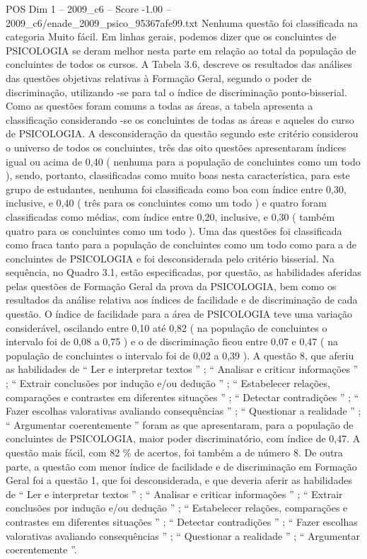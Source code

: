 \begin{textsample}{POS Dim 1 – 2009\_c6 – Score -1.00 – 2009\_c6/enade\_2009\_psico\_95367afe99.txt}
Nenhuma questão foi classificada na categoria Muito fácil.
Em linhas gerais, podemos dizer que os concluintes de PSICOLOGIA se deram melhor nesta parte em relação ao total da população de concluintes de todos os cursos.
A Tabela 3.6, descreve os resultados das análises das questões objetivas relativas à Formação Geral, segundo o poder de discriminação, utilizando -se para tal o índice de discriminação ponto-bisserial.
Como as questões foram comuns a todas as áreas, a tabela apresenta a classificação considerando -se os concluintes de todas as áreas e aqueles do curso de PSICOLOGIA.
A desconsideração da questão segundo este critério considerou o universo de todos os concluintes, três das oito questões apresentaram índices igual ou acima de 0,40 ( nenhuma para a população de concluintes como um todo ), sendo, portanto, classificadas como muito boas nesta característica, para este grupo de estudantes, nenhuma foi classificada como boa com índice entre 0,30, inclusive, e 0,40 ( três para os concluintes como um todo ) e quatro foram classificadas como médias, com índice entre 0,20, inclusive, e 0,30 ( também quatro para os concluintes como um todo ).
Uma das questões foi classificada como fraca tanto para a população de concluintes como um todo como para a de concluintes de PSICOLOGIA e foi desconsiderada pelo critério bisserial.
Na sequência, no Quadro 3.1, estão especificadas, por questão, as habilidades aferidas pelas questões de Formação Geral da prova da PSICOLOGIA, bem como os resultados da análise relativa aos índices de facilidade e de discriminação de cada questão.
O índice de facilidade para a área de PSICOLOGIA teve uma variação considerável, oscilando entre 0,10 até 0,82 ( na população de concluintes o intervalo foi de 0,08 a 0,75 ) e o de discriminação ficou entre 0,07 e 0,47 ( na população de concluintes o intervalo foi de 0,02 a 0,39 ).
A questão 8, que aferiu as habilidades de “ Ler e interpretar textos ” ; “ Analisar e criticar informações ” ; “ Extrair conclusões por indução e/ou dedução ” ; “ Estabelecer relações, comparações e contrastes em diferentes situações ” ; “ Detectar contradições ” ; “ Fazer escolhas valorativas avaliando consequências ” ; “ Questionar a realidade ” ; “ Argumentar coerentemente ” foram as que apresentaram, para a população de concluintes de PSICOLOGIA, maior poder discriminatório, com índice de 0,47.
A questão mais fácil, com 82 \% de acertos, foi também a de número 8.
De outra parte, a questão com menor índice de facilidade e de discriminação em Formação Geral foi a questão 1, que foi desconsiderada, e que deveria aferir as habilidades de “ Ler e interpretar textos ” ; “ Analisar e criticar informações ” ; “ Extrair conclusões por indução e/ou dedução ” ; “ Estabelecer relações, comparações e contrastes em diferentes situações ” ; “ Detectar contradições ” ; “ Fazer escolhas valorativas avaliando consequências ” ; “ Questionar a realidade ” ; “ Argumentar coerentemente ”.

\end{textsample}
